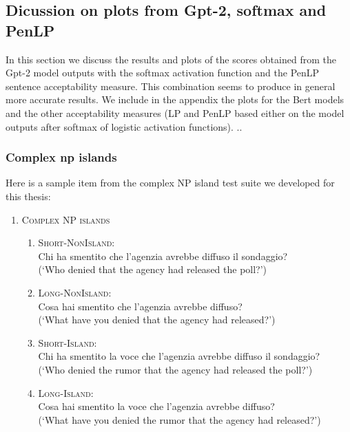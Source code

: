 

\subsection{Dicussion on plots from Gpt-2, softmax and PenLP}

In this section we discuss the results and plots of the scores obtained from the Gpt-2 model outputs with the softmax activation function and the PenLP sentence acceptability measure. This combination seems to produce in general more accurate results. We include in the appendix the plots for the Bert models and the other acceptability measures (LP and PenLP based either on the model outputs after softmax of logistic activation functions).
..


\subsubsection{Complex np islands}

Here is a sample item from the complex NP island test suite we developed for this thesis:

\renewcommand{\labelenumi}{(\arabic{enumi})}
\begin{enumerate}
	\item \textsc{Complex NP islands}
	\renewcommand{\labelenumii}{\alph{enumii}.}
	\begin{enumerate}
		\item \textsc{Short-NonIsland:} \\
		Chi ha smentito che l'agenzia avrebbe diffuso il sondaggio? \\
		(`Who denied that the agency had released the poll?')
		\item \textsc{Long-NonIsland:} \\
		Cosa hai smentito che l'agenzia avrebbe diffuso? \\
		(`What have you denied that the agency had released?')
		\item \textsc{Short-Island:} \\
		Chi ha smentito la voce che l'agenzia avrebbe diffuso il sondaggio? \\
		(`Who denied the rumor that the agency had released the poll?')
		\item \textsc{Long-Island:} \\				
		Cosa hai smentito la voce che l'agenzia avrebbe diffuso? \\
		(`What have you denied the rumor that the agency had released?')
		
	\end{enumerate}
\end{enumerate}

